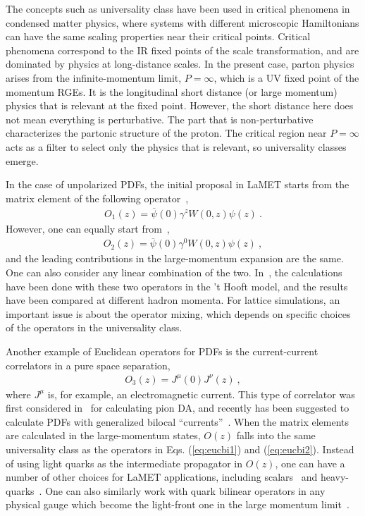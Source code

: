 \documentclass[aps,rmp,reprint,amsmath,amssymb,graphicx,longbibliography]{revtex4-1} %
\begin{document}
The concepts such as universality class have been used
in critical phenomena in condensed matter physics,
where systems with different microscopic Hamiltonians
can have the same scaling properties near their critical
points. Critical phenomena correspond to the IR fixed points of the scale transformation,
and are dominated by physics at long-distance scales.
In the present case, parton physics arises from the
infinite-momentum limit, $P=\infty$,
which is a UV fixed point of the momentum RGEs. It
is the longitudinal short distance (or large momentum)
physics that is relevant at the fixed point.
However, the short distance here does not mean everything
is perturbative. The part that is non-perturbative
characterizes the partonic structure of the proton. The critical region
near $P=\infty$ acts as a filter to select only the physics
that is relevant, so universality classes emerge.

In the case of unpolarized PDFs, the initial proposal in LaMET
starts from the matrix element of the following operator~\cite{Ji:2013dva},
\begin{align}
	O_1(z)=  \overline{\psi}(0)\gamma^zW(0,z)\psi(z) \ .
	\label{eq:eucbi1}
\end{align}
However, one can equally start from~\cite{Radyushkin:2016hsy,Constantinou:2017sej},
\begin{align}
	O_2(z)= \overline{\psi}(0)\gamma^0W(0,z)\psi(z) \ ,
	\label{eq:eucbi2}
\end{align}
and the leading contributions in the large-momentum expansion are the same. One can
also consider any linear combination of the two.
In~\cite{Jia:2018qee}, the calculations have been done with
these two operators in the 't Hooft model,
and the results have been compared at different
hadron momenta. For lattice simulations,
an important issue is about the operator mixing, which
depends on specific choices of the operators
in the universality class.

Another example of Euclidean operators for PDFs
is the current-current correlators
in a pure space separation,
\begin{align}
	O_3(z)=J^\mu(0)J^\nu(z) \ ,
\end{align}
where $J^\mu$ is, for example, an electromagnetic current.
This type of correlator was first considered in~\cite{Braun:2007wv,Bali:2017gfr}
for calculating pion DA, and recently
has been suggested to calculate PDFs with generalized
bilocal ``currents''~\cite{Ma:2017pxb}.
When the matrix elements are calculated in the large-momentum states,
$O(z)$ falls into the same universality class as the operators in Eqs. (\ref{eq:eucbi1}) and
(\ref{eq:eucbi2}). Instead of using light quarks as the intermediate propagator
in $O(z)$, one can have a number of other choices for LaMET applications, including
scalars~\cite{Aglietti:1998ur,Abada:2001if} and
heavy-quarks~\cite{Detmold:2005gg}. One can also similarly
work with quark bilinear operators in any physical gauge which become the light-front one in
the large momentum limit~\cite{Gupta:1993vp}.
\end{document}
